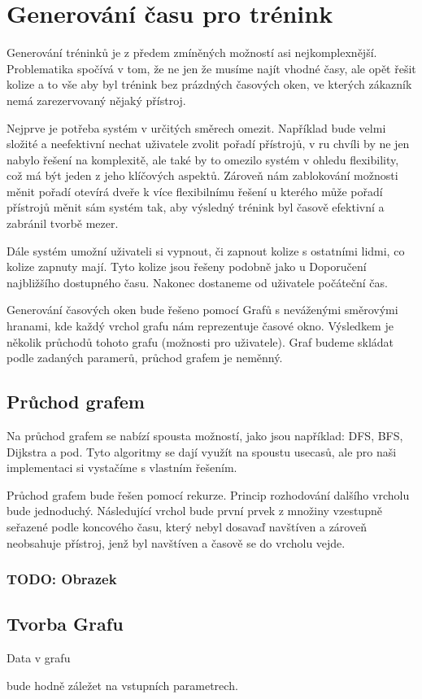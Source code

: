 \section{Generování času pro trénink}
Generování tréninků je z předem zmíněných možností asi nejkomplexnější. Problematika spočívá v tom, že ne jen že musíme najít vhodné časy, ale opět řešit kolize a to vše aby byl trénink bez prázdných časových oken, ve kterých zákazník nemá zarezervovaný nějaký přístroj. 

Nejprve je potřeba systém v určitých směrech omezit. Například bude velmi složité a neefektivní nechat uživatele zvolit pořadí přístrojů, v ru chvíli by ne jen nabylo řešení na komplexitě, ale také by to omezilo systém v ohledu flexibility, což má být jeden z jeho klíčových aspektů. Zároveň nám zablokování možnosti měnit pořadí otevírá dveře k více flexibilnímu řešení u kterého může pořadí přístrojů měnit sám systém tak, aby výsledný trénink byl časově efektivní a zabránil tvorbě mezer.

Dále systém umožní uživateli si vypnout, či zapnout kolize s ostatními lidmi, co kolize zapnuty mají. Tyto kolize jsou řešeny podobně jako u Doporučení najbližšího dostupného času. Nakonec dostaneme od uživatele počáteční čas. 

Generování časových oken bude řešeno pomocí Grafů s neváženými směrovými hranami, kde každý vrchol grafu nám reprezentuje časové okno. Výsledkem je několik průchodů tohoto grafu (možnosti pro uživatele). Graf budeme skládat podle zadaných paramerů, průchod grafem je neměnný. 

\subsection{Průchod grafem}
Na průchod grafem se nabízí spousta možností, jako jsou například: DFS, BFS, Dijkstra a pod. Tyto algoritmy se dají využít na spoustu usecasů, ale pro naši implementaci si vystačíme s vlastním řešením.

Průchod grafem bude řešen pomocí rekurze. Princip rozhodování dalšího vrcholu bude jednoduchý. Následující vrchol bude první prvek z množiny vzestupně seřazené podle koncového času, který nebyl dosavaď navštíven a zároveň neobsahuje přístroj, jenž byl navštíven a časově se do vrcholu vejde.

\subsubsection{TODO: Obrazek}

\subsection{Tvorba Grafu}
Data v grafu

bude hodně záležet na vstupních parametrech. 
